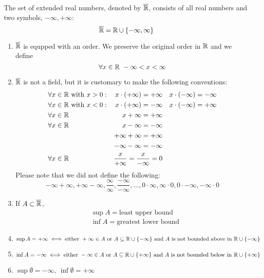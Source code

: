 \begin{definition}
    The set of extended real numbers, denoted by $\overline{\mathbb{R}}$, consists of all real numbers and two symbols, $-\infty, +\infty$:
    $$\overline{\mathbb{R}}=\mathbb{R} \cup \{-\infty, \infty\}$$
\end{definition}

\begin{enumerate}[$*)$]
    \item $\overline{\mathbb{R}}$ is equpped with an order. We preserve the original order in $\mathbb{R}$ and we define
    $$\forall x \in \mathbb{R} ~-\infty < x < \infty$$
    \item $\overline{\mathbb{R}}$ is not a field, but it is customary to make the following conventions:
    \begin{align*}
        &\forall x \in \mathbb{R} \text{ with $x > 0$}: &x \cdot (+\infty) = +\infty &&x \cdot (-\infty) = -\infty \\
        &\forall x \in \mathbb{R} \text{ with $x < 0$}: &x \cdot (+\infty) = -\infty &&x \cdot (-\infty) = +\infty \\
        &\forall x \in \mathbb{R} &x + \infty = + \infty \\
        &\forall x \in \mathbb{R} &x -\infty = -\infty \\
        &&+\infty + \infty = + \infty \\
        &&-\infty - \infty = -\infty \\
        &\forall x \in \mathbb{R} &\frac{x}{+\infty} = \frac{x}{-\infty} = 0
    \end{align*}
    Please note that we did not define the following:
    $$-\infty + \infty, +\infty -\infty, \frac{\infty}{\infty}, \frac{-\infty}{-\infty}, ..., 0 \cdot \infty, \infty \cdot 0,0 \cdot -\infty, -\infty \cdot 0$$
    \item If $A\subset \overline{\mathbb{R}}$,
    \begin{align*}
        &\sup{A} = \text{least upper bound} \\
        &\inf{A} = \text{greatest lower bound}
    \end{align*}
    \item $\sup{A} = +\infty \iff \text{either } +\infty \in A \text{ or } A \subseteq \mathbb{R} \cup \{-\infty\} \text{ and $A$ is not bounded above in $\mathbb{R} \cup \{-\infty\}$}$
    \item $\inf{A} = -\infty \iff \text{either } -\infty \in A \text{ or } A \subseteq \mathbb{R} \cup \{+\infty\} \text{ and $A$ is not bounded below in $\mathbb{R} \cup \{+\infty\}$}$
    \item $\sup{\emptyset} = -\infty, ~\inf{\emptyset} = +\infty$
\end{enumerate}

